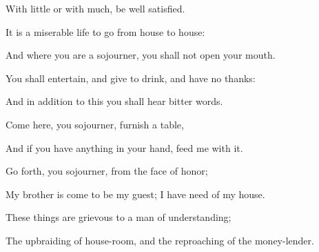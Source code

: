 {\par }{\Q {}With little or with much, be well satisfied.
\par }{\Q {}It is a miserable life to go from house to house:
\par }{\Q And where you are a sojourner, you shall not
{} open your mouth.
\par }{\Q {}You shall entertain, and give to drink, and have no thanks:
\par }{\Q And in addition to this you shall hear bitter words.
\par }{\Q {}Come here, you sojourner, furnish a table,
\par }{\Q And if you have anything in your hand, feed me with it.
\par }{\Q {}Go forth, you sojourner, from the face of honor;
\par }{\Q My brother is come to be my guest; I have need of my house.
\par }{\Q {}These things are grievous to a man of understanding;
\par }{\Q The upbraiding of house-room, and the reproaching of the money-lender.
\par }{\BB \par }
